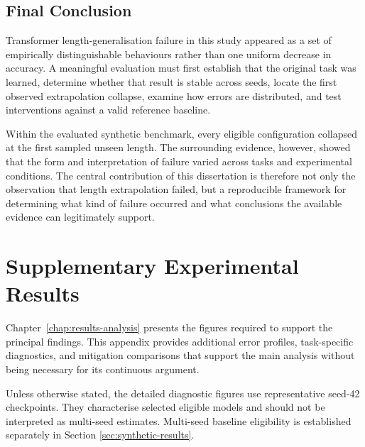 \documentclass[
    author={Aanchala Ravindra Bhongade},
    supervisor={Dr. Fernando Moreno-Pino},
    degree={MSc},
    title={Length Generalisation in Transformer-Based Sequence Models: Failure Taxonomy and Mitigation Strategies},
    subtitle={},
    type={},
    year={2026}
]{dissertation}
\begin{document}
\section{Final Conclusion}

Transformer length-generalisation failure in this study appeared as a set of empirically distinguishable behaviours rather than one uniform decrease in accuracy. A meaningful evaluation must first establish that the original task was learned, determine whether that result is stable across seeds, locate the first observed extrapolation collapse, examine how errors are distributed, and test interventions against a valid reference baseline.

Within the evaluated synthetic benchmark, every eligible configuration collapsed at the first sampled unseen length. The surrounding evidence, however, showed that the form and interpretation of failure varied across tasks and experimental conditions. The central contribution of this dissertation is therefore not only the observation that length extrapolation failed, but a reproducible framework for determining what kind of failure occurred and what conclusions the available evidence can legitimately support.





\backmatter




\appendix


\chapter{Supplementary Experimental Results}
\label{app:supplementary-results}

\noindent
Chapter~\ref{chap:results-analysis} presents the figures required to support the principal findings. This appendix provides additional error profiles, task-specific diagnostics, and mitigation comparisons that support the main analysis without being necessary for its continuous argument.

Unless otherwise stated, the detailed diagnostic figures use representative seed-42 checkpoints. They characterise selected eligible models and should not be interpreted as multi-seed estimates. Multi-seed baseline eligibility is established separately in Section \ref{sec:synthetic-results}.
\end{document}
